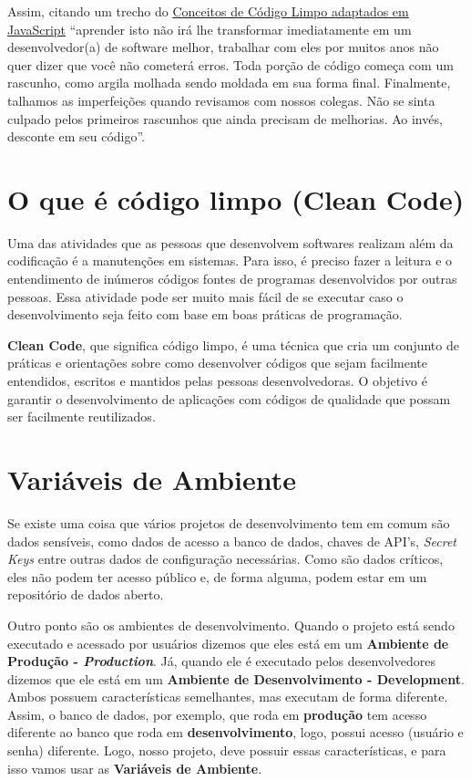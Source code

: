 Assim, citando um trecho do \href{https://github.com/felipe-augusto/clean-code-javascript}{Conceitos de Código Limpo adaptados em JavaScript} ``aprender isto não irá lhe transformar imediatamente em um desenvolvedor(a) de software melhor, trabalhar com eles por muitos anos não quer dizer que você não cometerá erros. Toda porção de código começa com um rascunho, como argila molhada sendo moldada em sua forma final. Finalmente, talhamos as imperfeições quando revisamos com nossos colegas. Não se sinta culpado pelos primeiros rascunhos que ainda precisam de melhorias. Ao invés, desconte em seu código''.

\section{O que é código limpo (Clean Code)}

Uma das atividades que as pessoas que desenvolvem softwares realizam além da codificação é a manutenções em sistemas. Para isso, é preciso fazer a leitura e o entendimento de inúmeros códigos fontes de programas desenvolvidos por outras pessoas. Essa atividade pode ser muito mais fácil de se executar caso o desenvolvimento seja feito com base em boas práticas de programação.

\textbf{Clean Code}, que significa código limpo, é uma técnica que cria um conjunto de práticas e orientações sobre como desenvolver códigos que sejam facilmente entendidos, escritos e mantidos pelas pessoas desenvolvedoras. O objetivo é garantir o desenvolvimento de aplicações com códigos de qualidade que possam ser facilmente reutilizados.

\section{Variáveis de Ambiente}

Se existe uma coisa que vários projetos de desenvolvimento tem em comum são dados sensíveis, como dados de acesso a banco de dados, chaves de API's, \textit{Secret Keys} entre outras dados de configuração necessárias. Como são dados críticos, eles não podem ter acesso público e, de forma alguma, podem estar em um repositório de dados aberto. 

Outro ponto são os ambientes de desenvolvimento. Quando o projeto está sendo executado e acessado por usuários dizemos que eles está em um \textbf{Ambiente de Produção - \textit{Production}}. Já, quando ele é executado pelos desenvolvedores dizemos que ele está em um \textbf{Ambiente de Desenvolvimento - Development}. Ambos possuem características semelhantes, mas executam de forma diferente. Assim, o banco de dados, por exemplo, que roda em \textbf{produção} tem acesso diferente ao banco que roda em \textbf{desenvolvimento}, logo, possui acesso (usuário e senha) diferente. Logo, nosso projeto, deve possuir essas características, e para isso vamos usar as \textbf{Variáveis de Ambiente}. 

